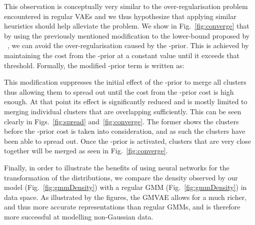 \documentclass{article} \usepackage{iclr2017_conference,times}
\begin{document}
This observation is conceptually very similar to the over-regularisation problem encountered in regular VAEs and we thus hypothesize that applying similar heuristics should help alleviate the problem. We show in Fig.~\ref{fig:converge} that by using the previously mentioned modification to the lower-bound proposed by ~\cite{kingma2016improving}, we can avoid the over-regularisation caused by the -prior. This is achieved by maintaining the cost from the -prior at a constant value  until it exceeds that threshold. Formally, the modified -prior term is written as:



This modification suppresses the initial effect of the -prior to merge all clusters thus allowing them to spread out until the cost from the -prior cost is high enough. At that point its effect is significantly reduced and is mostly limited to merging individual clusters that are overlapping sufficiently. This can be seen clearly in Figs.~\ref{fig:spread} and~\ref{fig:converge}. The former shows the clusters before the -prior cost is taken into consideration, and as such the clusters have been able to spread out. Once the -prior is activated, clusters that are very close together will be merged as seen in Fig.~\ref{fig:converge}. 


Finally, in order to illustrate the benefits of using neural networks for the transformation of the distributions, we compare the density observed by our model (Fig.~\ref{fig:gmmDensity}) with a regular GMM (Fig.~\ref{fig:gmmDensity}) in data space. As illustrated by the figures, the GMVAE allows for a much richer, and thus more accurate representations than regular GMMs, and is therefore more successful at modelling non-Gaussian data. 
\end{document}

